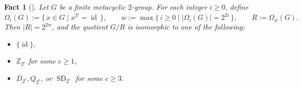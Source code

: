\documentclass[onecolumn]{article}
\numberwithin{equation}{section}
\theoremstyle{mytheoremstyle}
\newtheorem{fac}[thm]{Fact}
\DeclareMathOperator{\id}{\mathrm{id}}
\DeclareMathOperator{\SD}{\mathrm{SD}}
\begin{document}
\begin{fac}[\cite{Berkovich2011}]\label{fac:metacyclic-2-RG-quotient}
Let $G$ be a finite metacyclic $2$-group.
For each integer $i\ge0$, define
\[
  \Omega_i(G) := \{\,x\in G \mid x^{2^i}=\id\,\},\qquad
  w:=\max\{\, i\ge 0 \mid |\Omega_i(G)| = 2^{2i} \,\},\qquad
  R:=\Omega_{w}(G).
\]
Then $|R| = 2^{2w}$, and the quotient $G/R$ is isomorphic to one of
the following:
\begin{itemize}
  \item $\{\id\}$,
  \item $\mathbb{Z}_{2^{c}}$ for some $c\ge1$,
  \item $D_{2^{c}}, Q_{2^{c}}$, or
$\SD_{2^{c}}$ for some $c\ge3$.
\end{itemize}

\end{fac}
\end{document}
